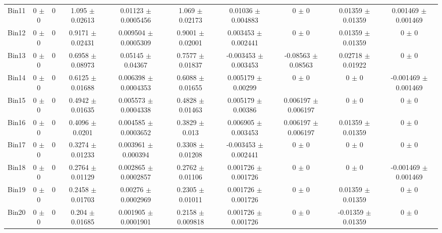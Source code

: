 \begin{tabular}{@{\extracolsep{4pt}}lccccccccc@{}}
     Bin11 & 0 $\pm$ 0 & 0 & 1.095 $\pm$ 0.02613 & 0.01123 $\pm$ 0.0005456 & 1.069 $\pm$ 0.02173 & 0.01036 $\pm$ 0.004883 & 0 $\pm$ 0 & 0.01359 $\pm$ 0.01359 & 0.001469 $\pm$ 0.001469 \\ 
     Bin12 & 0 $\pm$ 0 & 0 & 0.9171 $\pm$ 0.02431 & 0.009504 $\pm$ 0.0005309 & 0.9001 $\pm$ 0.02001 & 0.003453 $\pm$ 0.002441 & 0 $\pm$ 0 & 0.01359 $\pm$ 0.01359 & 0 $\pm$ 0 \\ 
     Bin13 & 0 $\pm$ 0 & 0 & 0.6958 $\pm$ 0.08973 & 0.05145 $\pm$ 0.04367 & 0.7577 $\pm$ 0.01837 & -0.003453 $\pm$ 0.003453 & -0.08563 $\pm$ 0.08563 & 0.02718 $\pm$ 0.01922 & 0 $\pm$ 0 \\ 
     Bin14 & 0 $\pm$ 0 & 0 & 0.6125 $\pm$ 0.01688 & 0.006398 $\pm$ 0.0004353 & 0.6088 $\pm$ 0.01655 & 0.005179 $\pm$ 0.00299 & 0 $\pm$ 0 & 0 $\pm$ 0 & -0.001469 $\pm$ 0.001469 \\ 
     Bin15 & 0 $\pm$ 0 & 0 & 0.4942 $\pm$ 0.01635 & 0.005573 $\pm$ 0.0004338 & 0.4828 $\pm$ 0.01463 & 0.005179 $\pm$ 0.00386 & 0.006197 $\pm$ 0.006197 & 0 $\pm$ 0 & 0 $\pm$ 0 \\ 
     Bin16 & 0 $\pm$ 0 & 0 & 0.4096 $\pm$ 0.0201 & 0.004585 $\pm$ 0.0003652 & 0.3829 $\pm$ 0.013 & 0.006905 $\pm$ 0.003453 & 0.006197 $\pm$ 0.006197 & 0.01359 $\pm$ 0.01359 & 0 $\pm$ 0 \\ 
     Bin17 & 0 $\pm$ 0 & 0 & 0.3274 $\pm$ 0.01233 & 0.003961 $\pm$ 0.000394 & 0.3308 $\pm$ 0.01208 & -0.003453 $\pm$ 0.002441 & 0 $\pm$ 0 & 0 $\pm$ 0 & 0 $\pm$ 0 \\ 
     Bin18 & 0 $\pm$ 0 & 0 & 0.2764 $\pm$ 0.01129 & 0.002865 $\pm$ 0.0002857 & 0.2762 $\pm$ 0.01106 & 0.001726 $\pm$ 0.001726 & 0 $\pm$ 0 & 0 $\pm$ 0 & -0.001469 $\pm$ 0.001469 \\ 
     Bin19 & 0 $\pm$ 0 & 0 & 0.2458 $\pm$ 0.01703 & 0.00276 $\pm$ 0.0002969 & 0.2305 $\pm$ 0.01011 & 0.001726 $\pm$ 0.001726 & 0 $\pm$ 0 & 0.01359 $\pm$ 0.01359 & 0 $\pm$ 0 \\ 
     Bin20 & 0 $\pm$ 0 & 0 & 0.204 $\pm$ 0.01685 & 0.001905 $\pm$ 0.0001901 & 0.2158 $\pm$ 0.009818 & 0.001726 $\pm$ 0.001726 & 0 $\pm$ 0 & -0.01359 $\pm$ 0.01359 & 0 $\pm$ 0 \\ 
\hline\hline
  \end{tabular}
